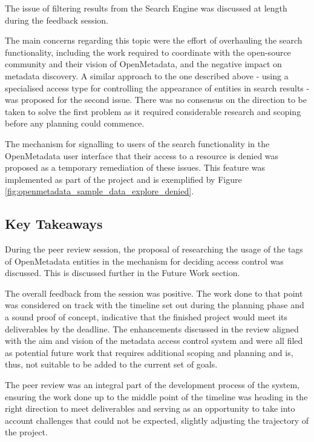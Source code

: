 The issue of filtering results from the Search Engine was discussed at length during the feedback session.

The main concerns regarding this topic were the effort of overhauling the search functionality, including the work required to coordinate with the open-source community and their vision of OpenMetadata, and the negative impact on metadata discovery. A similar approach to the one described above - using a specialised access type for controlling the appearance of entities in search results - was proposed for the second issue. There was no consensus on the direction to be taken to solve the first problem as it required considerable research and scoping before any planning could commence.

The mechanism for signalling to users of the search functionality in the OpenMetadata user interface that their access to a resource is denied was proposed as a temporary remediation of these issues. This feature was implemented as part of the project and is exemplified by Figure \ref{fig:openmetadata_sample_data_explore_denied}.

\subsection{Key Takeaways}

During the peer review session, the proposal of researching the usage of the tags of OpenMetadata entities in the mechanism for deciding access control was discussed. This is discussed further in the Future Work section.

The overall feedback from the session was positive. The work done to that point was considered on track with the timeline set out during the planning phase and a sound proof of concept, indicative that the finished project would meet its deliverables by the deadline. The enhancements discussed in the review aligned with the aim and vision of the metadata access control system and were all filed as potential future work that requires additional scoping and planning and is, thus, not suitable to be added to the current set of goals.

The peer review was an integral part of the development process of the system, ensuring the work done up to the middle point of the timeline was heading in the right direction to meet deliverables and serving as an opportunity to take into account challenges that could not be expected, slightly adjusting the trajectory of the project.


